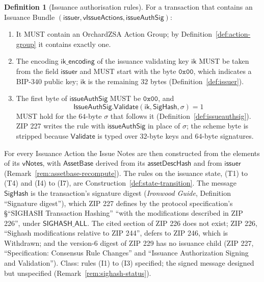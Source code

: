 \documentclass[11pt,a4paper]{article}
\theoremstyle{definition}
\newtheorem{definition}[theorem]{Definition}
\begin{document}
\begin{definition}[Issuance authorisation rules]\label{def:issue-auth}
For a transaction that contains an Issuance Bundle
$(\mathsf{issuer}, \mathsf{vIssueActions}, \mathsf{issueAuthSig})$:
\begin{enumerate}
\item[(I1)] It MUST contain an OrchardZSA Action Group; by
  Definition~\ref{def:action-group} it contains exactly one.
\item[(I2)] The encoding $\mathsf{ik\_encoding}$ of the issuance validating
  key $\mathsf{ik}$ MUST be taken from the field $\mathsf{issuer}$ and MUST
  start with the byte $\mathtt{0x00}$, which indicates a BIP-340 public
  key; $\mathsf{ik}$ is the remaining $32$ bytes
  (Definition~\ref{def:issuer}).
\item[(I3)] The first byte of $\mathsf{issueAuthSig}$ MUST be
  $\mathtt{0x00}$, and
  \[
    \mathsf{IssueAuthSig}.\mathsf{Validate}(\mathsf{ik}, \mathsf{SigHash},
    \sigma) = 1
  \]
  MUST hold for the $64$-byte $\sigma$ that follows it
  (Definition~\ref{def:issueauthsig}). ZIP 227 writes the rule with
  $\mathsf{issueAuthSig}$ in place of $\sigma$; the scheme byte is stripped
  because $\mathsf{Validate}$ is typed over $32$-byte keys and $64$-byte
  signatures.
\end{enumerate}
For every Issuance Action the Issue Notes are then constructed from the
elements of its $\mathsf{vNotes}$, with $\mathsf{AssetBase}$ derived from
its $\mathsf{assetDescHash}$ and from $\mathsf{issuer}$
(Remark~\ref{rem:assetbase-recompute}). The rules on the issuance state,
(T1) to (T4) and (I4) to (I7), are Construction~\ref{def:state-transition}.
The message $\mathsf{SigHash}$ is the transaction's signature digest
(\emph{Ironwood Guide}, Definition ``Signature digest''), which ZIP 227
defines by the protocol specification's \S``SIGHASH Transaction Hashing''
``with the modifications described in ZIP 226'', under
$\mathsf{SIGHASH\_ALL}$. The cited section of ZIP 226 does not exist; ZIP
226, ``Sighash modifications relative to ZIP 244'', defers to ZIP 246,
which is Withdrawn; and the version-$6$ digest of ZIP 229 has no issuance
child (ZIP 227, ``Specification: Consensus Rule Changes'' and ``Issuance
Authorization Signing and Validation''). Class: rules (I1) to (I3)
specified; the signed message designed but unspecified
(Remark~\ref{rem:sighash-status}).
\end{definition}
\end{document}
